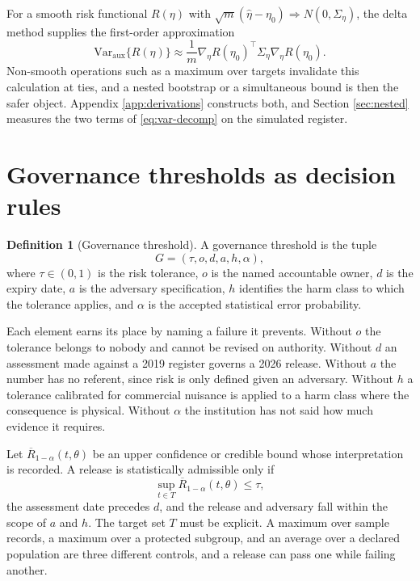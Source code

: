 \documentclass[11pt,a4paper]{article}
\theoremstyle{plain}
\theoremstyle{definition}
\newtheorem{definition}{Definition}
\begin{document}
For a smooth risk functional $R(\eta)$ with $\sqrt m(\widehat\eta-\eta_0)
\Rightarrow N(0,\Sigma_\eta)$, the delta method supplies the first-order
approximation \citep{vandervaart1998}
\begin{equation}
\mathrm{Var}_{\mathrm{aux}}\{R(\widehat\eta)\}
\approx \frac{1}{m}\nabla_\eta R(\eta_0)^\top
\Sigma_\eta\nabla_\eta R(\eta_0) .
\label{eq:delta-risk}
\end{equation}
Non-smooth operations such as a maximum over targets invalidate this calculation
at ties, and a nested bootstrap or a simultaneous bound is then the safer object.
Appendix \ref{app:derivations} constructs both, and Section \ref{sec:nested}
measures the two terms of \eqref{eq:var-decomp} on the simulated register.

\section{Governance thresholds as decision rules}\label{sec:gov}

\begin{definition}[Governance threshold]\label{def:thresh}
A governance threshold is the tuple
\begin{equation}
G = (\tau, o, d, a, h, \alpha) ,
\label{eq:tuple}
\end{equation}
where $\tau \in (0,1)$ is the risk tolerance, $o$ is the named accountable
owner, $d$ is the expiry date, $a$ is the adversary specification, $h$
identifies the harm class to which the tolerance applies, and $\alpha$ is the
accepted statistical error probability.
\end{definition}

Each element earns its place by naming a failure it prevents. Without $o$ the
tolerance belongs to nobody and cannot be revised on authority. Without $d$ an
assessment made against a 2019 register governs a 2026 release. Without $a$ the
number has no referent, since risk is only defined given an adversary. Without
$h$ a tolerance calibrated for commercial nuisance is applied to a harm class
where the consequence is physical. Without $\alpha$ the institution has not
said how much evidence it requires.

Let $\overline{R}_{1-\alpha}(t, \theta)$ be an upper confidence or credible bound whose
interpretation is recorded. A release is statistically admissible only if
\begin{equation}
\sup_{t \in T} \overline{R}_{1-\alpha}(t, \theta) \leq \tau ,
\label{eq:admiss}
\end{equation}
the assessment date precedes $d$, and the release and adversary fall within the
scope of $a$ and $h$. The target set $T$ must be explicit. A maximum over
sample records, a maximum over a protected subgroup, and an average over a
declared population are three different controls, and a release can pass one
while failing another.
\end{document}
